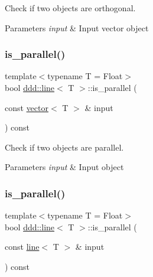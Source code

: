Check if two objects are orthogonal. 


\begin{DoxyParams}{Parameters}
{\em input} & Input vector object \\
\hline
\end{DoxyParams}
\mbox{\label{classddd_1_1line_a9a299f9e7241572177826969d96fefe6}} 
\subsubsection{\texorpdfstring{is\+\_\+parallel()}{is\_parallel()}\hspace{0.1cm}{\footnotesize\ttfamily [1/5]}}
{\footnotesize\ttfamily template$<$typename T = Float$>$ \\
bool \hyperlink{classddd_1_1line}{ddd\+::line}$<$ T $>$\+::is\+\_\+parallel (\begin{DoxyParamCaption}\item[{const \hyperlink{classddd_1_1vector}{vector}$<$ T $>$ \&}]{input }\end{DoxyParamCaption}) const\hspace{0.3cm}{\ttfamily [inline]}}



Check if two objects are parallel. 


\begin{DoxyParams}{Parameters}
{\em input} & Input object \\
\hline
\end{DoxyParams}
\mbox{\label{classddd_1_1line_aba281798b6743c8bbab01df3613325ac}} 
\subsubsection{\texorpdfstring{is\+\_\+parallel()}{is\_parallel()}\hspace{0.1cm}{\footnotesize\ttfamily [2/5]}}
{\footnotesize\ttfamily template$<$typename T = Float$>$ \\
bool \hyperlink{classddd_1_1line}{ddd\+::line}$<$ T $>$\+::is\+\_\+parallel (\begin{DoxyParamCaption}\item[{const \hyperlink{classddd_1_1line}{line}$<$ T $>$ \&}]{input }\end{DoxyParamCaption}) const\hspace{0.3cm}{\ttfamily [inline]}}



